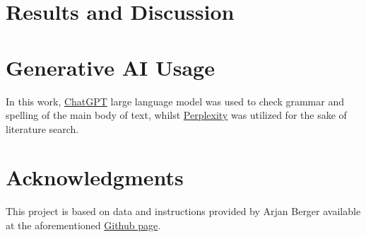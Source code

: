 \documentclass[12pt]{article}
\begin{document}
\section*{Results and Discussion}


\section*{Generative AI Usage}
In this work, \href{https://chatgpt.com}{ChatGPT} large language model was used to check grammar and spelling of the main body of text, whilst \href{https://www.perplexity.ai}{Perplexity} was utilized for the sake of literature search.

\section*{Acknowledgments}
This project is based on data and instructions provided by Arjan Berger available at the aforementioned \href{https://github.com/almakhmudov/LTTC-Homework--QD}{Github page}.


\end{document}
